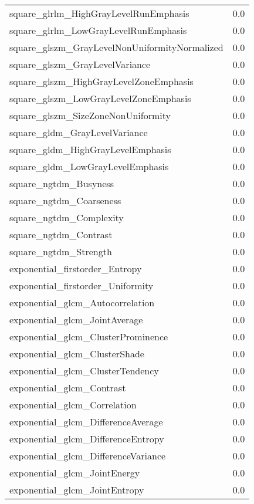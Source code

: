 {\begin{xltabular}[H]{\textwidth}{X r}
        square\_glrlm\_HighGrayLevelRunEmphasis & 0.0 \\
        square\_glrlm\_LowGrayLevelRunEmphasis & 0.0 \\
        square\_glszm\_GrayLevelNonUniformityNormalized & 0.0 \\
        square\_glszm\_GrayLevelVariance & 0.0 \\
        square\_glszm\_HighGrayLevelZoneEmphasis & 0.0 \\
        square\_glszm\_LowGrayLevelZoneEmphasis & 0.0 \\
        square\_glszm\_SizeZoneNonUniformity & 0.0 \\
        square\_gldm\_GrayLevelVariance & 0.0 \\
        square\_gldm\_HighGrayLevelEmphasis & 0.0 \\
        square\_gldm\_LowGrayLevelEmphasis & 0.0 \\
        square\_ngtdm\_Busyness & 0.0 \\
        square\_ngtdm\_Coarseness & 0.0 \\
        square\_ngtdm\_Complexity & 0.0 \\
        square\_ngtdm\_Contrast & 0.0 \\
        square\_ngtdm\_Strength & 0.0 \\
        exponential\_firstorder\_Entropy & 0.0 \\
        exponential\_firstorder\_Uniformity & 0.0 \\
        exponential\_glcm\_Autocorrelation & 0.0 \\
        exponential\_glcm\_JointAverage & 0.0 \\
        exponential\_glcm\_ClusterProminence & 0.0 \\
        exponential\_glcm\_ClusterShade & 0.0 \\
        exponential\_glcm\_ClusterTendency & 0.0 \\
        exponential\_glcm\_Contrast & 0.0 \\
        exponential\_glcm\_Correlation & 0.0 \\
        exponential\_glcm\_DifferenceAverage & 0.0 \\
        exponential\_glcm\_DifferenceEntropy & 0.0 \\
        exponential\_glcm\_DifferenceVariance & 0.0 \\
        exponential\_glcm\_JointEnergy & 0.0 \\
        exponential\_glcm\_JointEntropy & 0.0 \\

\end{xltabular}}
